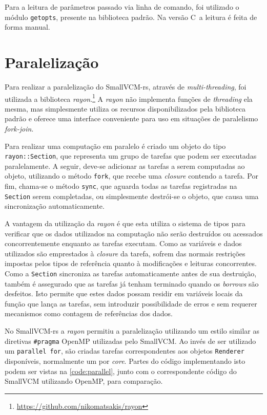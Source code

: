 \documentclass[tg]{mdtufsm}
\def\Cpp{{C\nolinebreak[4]\raisebox{.20ex}{\small\bf++}}}
\begin{document}
Para a leitura de parâmetros passado via linha de comando, foi utilizado o módulo \texttt{getopts}, presente na biblioteca padrão. Na versão \Cpp\ a leitura é feita de forma manual.

\section{Paralelização}

Para realizar a paralelização do SmallVCM-rs, através de \emph{multi-threading}, foi utilizada a biblioteca \emph{rayon}.\footnote{\url{https://github.com/nikomatsakis/rayon}} A \emph{rayon} não implementa funções de \emph{threading} ela mesma, mas simplesmente utiliza os recursos disponibilizados pela biblioteca padrão e oferece uma interface conveniente para uso em situações de paralelismo \emph{fork-join}.

Para realizar uma computação em paralelo é criado um objeto do tipo \texttt{rayon::Section}, que representa um grupo de tarefas que podem ser executadas paralelamente. A seguir, deve-se adicionar as tarefas a serem computadas ao objeto, utilizando o método \texttt{fork}, que recebe uma \emph{closure} contendo a tarefa. Por fim, chama-se o método \texttt{sync}, que aguarda todas as tarefas registradas na \texttt{Section} serem completadas, ou simplesmente destrói-se o objeto, que causa uma sincronização automaticamente.

A vantagem da utilização da \emph{rayon} é que esta utiliza o sistema de tipos para verificar que os dados utilizados na computação não serão destruídos ou acessados concorrentemente enquanto as tarefas executam. Como as variáveis e dados utilizados são emprestados à \emph{closure} da tarefa, sofrem das normais restrições impostas pelos tipos de referência quanto à modificações e leituras concorrentes. Como a \texttt{Section} sincroniza as tarefas automaticamente antes de sua destruição, também é assegurado que as tarefas já tenham terminado quando os \emph{borrows} são desfeitos. Isto permite que estes dados possam residir em variáveis locais da função que lança as tarefas, sem introduzir possibilidade de erros e sem requerer mecanismos como contagem de referências dos dados.

No SmallVCM-rs a \emph{rayon} permitiu a paralelização utilizando um estilo similar as diretivas \texttt{\#pragma} OpenMP utilizadas pelo SmallVCM. Ao invés de ser utilizado um \texttt{parallel for}, são criadas tarefas correspondentes aos objetos \texttt{Renderer} disponíveis, normalmente um por \emph{core}. Partes do código implementando isto podem ser vistas na \autoref{code:parallel}, junto com o correspondente código do SmallVCM utilizando OpenMP, para comparação.
\end{document}
